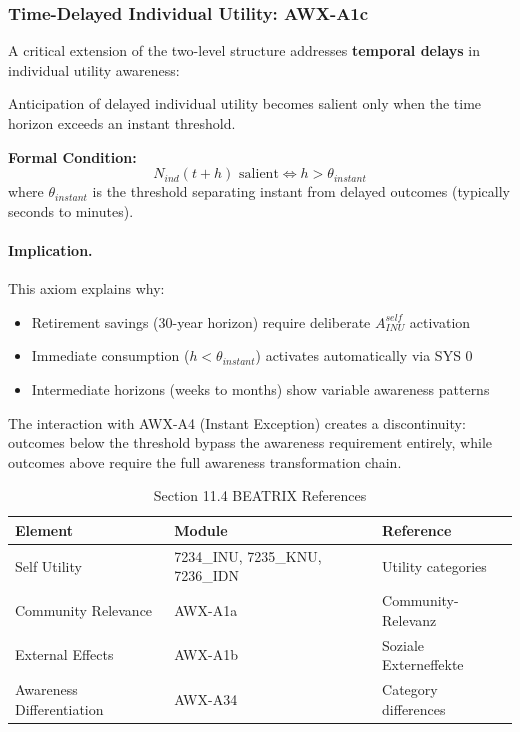 \begin{table}[htbp]
\centering

\subsubsection{Time-Delayed Individual Utility: AWX-A1c}

A critical extension of the two-level structure addresses \textbf{temporal delays}
in individual utility awareness:

\begin{axiom}
Anticipation of delayed individual utility becomes salient only when the time 
horizon exceeds an instant threshold.

\textbf{Formal Condition:}
\begin{equation}
N_{ind}(t+h) \text{ salient} \Leftrightarrow h > \theta_{instant}
\end{equation}
where $\theta_{instant}$ is the threshold separating instant from delayed 
outcomes (typically seconds to minutes).
\end{axiom}

\paragraph{Implication.}
This axiom explains why:
\begin{itemize}
    \item Retirement savings (30-year horizon) require deliberate $A^{self}_{INU}$ activation
    \item Immediate consumption ($h < \theta_{instant}$) activates automatically via SYS 0
    \item Intermediate horizons (weeks to months) show variable awareness patterns
\end{itemize}

The interaction with AWX-A4 (Instant Exception) creates a discontinuity: 
outcomes below the threshold bypass the awareness requirement entirely, while 
outcomes above require the full awareness transformation chain.

\caption{Section 11.4 BEATRIX References}
\label{tab:11-4-beatrix}
\renewcommand{\arraystretch}{1.3}
\begin{tabular}{@{}lll@{}}
\toprule
\textbf{Element} & \textbf{Module} & \textbf{Reference} \\
\midrule
Self Utility & 7234\_INU, 7235\_KNU, 7236\_IDN & Utility categories \\
Community Relevance & AWX-A1a & Community-Relevanz \\
External Effects & AWX-A1b & Soziale Externeffekte \\
Awareness Differentiation & AWX-A34 & Category differences \\
\bottomrule
\end{tabular}
\end{table}

